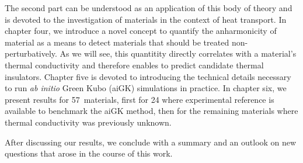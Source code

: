 The second part can be understood as an application of this body of theory and is devoted to the investigation of materials in the context of heat transport. In chapter four, we introduce a novel concept to quantify the anharmonicity of material as a means to detect materials that should be treated non-perturbatively. As we will see, this quantitity directly correlates with a material's thermal conductivity and therefore enables to predict candidate thermal insulators. Chapter five is devoted to introducing the technical details necessary to run \emph{ab initio} Green Kubo (aiGK) simulations in practice. In chapter six, we present results for 57~materials, first for 24 where experimental reference is available to benchmark the aiGK method, then for the remaining materials where thermal conductivity was previously unknown. 

After discussing our results, we conclude with a summary and an outlook on new questions that arose in the course of this work.
  